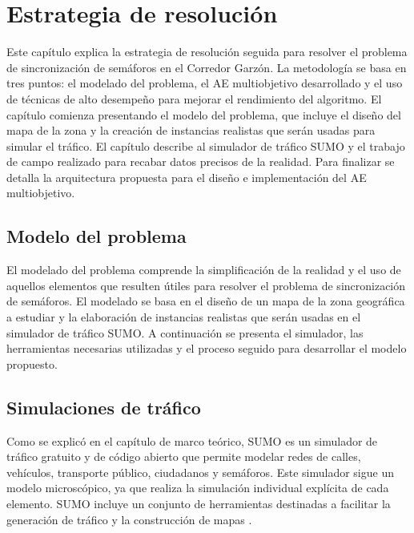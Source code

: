 \chapter{Estrategia de resolución}

Este capítulo explica la estrategia de resolución seguida para resolver el problema de sincronización de semáforos en el Corredor Garzón. La metodología se basa en tres puntos: el modelado del problema, el AE multiobjetivo desarrollado y el uso de técnicas de alto desempeño para mejorar el rendimiento del algoritmo. El capítulo comienza presentando el modelo del problema, que incluye el diseño del mapa de la zona y la creación de instancias realistas que serán usadas para simular el tráfico. El capítulo describe al simulador de tráfico SUMO y el trabajo de campo realizado para recabar datos precisos de la realidad. Para finalizar se detalla la arquitectura propuesta para el diseño e implementación del AE multiobjetivo.



\section{Modelo del problema }

El modelado del problema comprende la simplificación de la realidad y el uso de aquellos elementos que resulten útiles para resolver el problema de sincronización de semáforos. El modelado se basa en el diseño de un mapa de la zona geográfica a estudiar y la elaboración de instancias realistas que serán usadas en el simulador de tráfico SUMO. A continuación se presenta el simulador, las herramientas necesarias utilizadas y el proceso seguido para desarrollar el modelo propuesto. 

\section{Simulaciones de tráfico}

Como se explicó en el capítulo de marco teórico, SUMO es un simulador de tráfico gratuito y de código abierto que permite modelar redes de calles, vehículos, transporte público, ciudadanos y semáforos. Este simulador sigue un modelo microscópico, ya que realiza la simulación individual explícita de cada elemento. SUMO incluye un conjunto de herramientas destinadas a facilitar la generación de tráfico y la construcción de mapas \citep{SumoTools}. 

